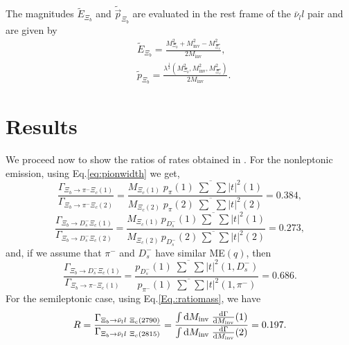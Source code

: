 \documentclass{PoS}
\begin{document}
The magnitudes $\tilde{E}_{\Xi_b}$ and $\tilde{\vec{p}}_{\Xi_b}$ are evaluated in the rest frame of the $\bar\nu_l l$ pair and are given by
\begin{subequations}
\begin{align}
& \tilde{E}_{\Xi_b} = \frac{M^2_{\Xi_b}+M^2_{\text{inv}}-M^2_{\Xi_c^*}}{2 M_{\text{inv}}}, \\
& \tilde{p}_{\Xi_b} = \frac{\lambda^{\frac{1}{2}}\left(M^2_{\Xi_b},M^2_{\text{inv}},M^2_{\Xi_c^*} \right)}{2 M_{\text{inv}}}.
\end{align}
\end{subequations}

\section{Results}
We proceed now to show the ratios of rates obtained in \cite{pavao}. 
For the nonleptonic emission, using Eq.\eqref{eq:pionwidth} we get,
\begin{equation}
\label{Eq.:ratiorate}
\frac{\Gamma_{\Xi_b \rightarrow \pi^- \Xi_c (1)}}{\Gamma_{\Xi_b \rightarrow \pi^- \Xi_c (2)}}= \frac{M_{\Xi_c (1)} \;p_{\pi}(1) \;\overline{\sum}\sum |t|^2(1)}{M_{\Xi_c (2)} \;p_{\pi}(2)\; \overline{\sum}\sum |t|^2(2)} = 0.384,
\end{equation}
\begin{equation}
\label{Eq.:ratiorate2}
\frac{\Gamma_{\Xi_b \rightarrow D_s^- \Xi_c (1)}}{\Gamma_{\Xi_b \rightarrow D_s^- \Xi_c (2)}}= \frac{M_{\Xi_c (1)} \,p_{D_s^-}(1) \,\overline{\sum}\sum |t|^2(1)}{M_{\Xi_c (2)} \,p_{D_s^-}(2) \,\overline{\sum}\sum |t|^2(2)} =0.273,
\end{equation}
and, if we assume that $\pi^-$ and $D_s^-$ have similar ME$(q)$, then
\begin{equation}
\label{Eq.:ratiorate3}
\frac{\Gamma_{\Xi_b \rightarrow D_s^- \Xi_c (1)}}{\Gamma_{\Xi_b \rightarrow \pi^- \Xi_c (1)}}= \frac{p_{D_s^-}(1)\; \overline{\sum}\sum |t|^2(1,D_s^-)}{p_{\pi^-}(1)\; \overline{\sum}\sum |t|^2(1,\pi^-)} =0.686.
\end{equation}
For the semileptonic case, using Eq.\eqref{Eq.:ratiomass}, we have 
\begin{equation}
R= \frac{\Gamma_{\Xi_b \rightarrow \bar{\nu}_l l \ \Xi_c (2790)}}{\Gamma_{\Xi_b \rightarrow \bar{\nu}_l l \ \Xi_c (2815)}} = \frac{\int {\rm d} M_{\rm inv} \; \frac{{\rm d}\Gamma}{{\rm d}M_{\rm inv}}(1)}{\int {\rm d} M_{\rm inv}\; \frac{{\rm d}\Gamma}{{\rm d}M_{\rm inv}}(2)}=0.197.
\end{equation}
\end{document}
